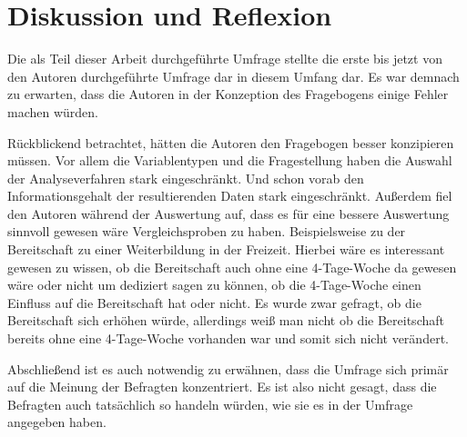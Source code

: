 \chapter{Diskussion und Reflexion}


Die als Teil dieser Arbeit durchgeführte Umfrage stellte die erste bis jetzt von den Autoren durchgeführte
Umfrage dar in diesem Umfang dar. Es war demnach zu erwarten, dass die Autoren in der Konzeption des Fragebogens
einige Fehler machen würden. 

Rückblickend betrachtet, hätten die Autoren den Fragebogen besser konzipieren müssen.
Vor allem die Variablentypen und die Fragestellung haben die Auswahl der Analyseverfahren stark eingeschränkt. Und schon
vorab den Informationsgehalt der resultierenden Daten stark eingeschränkt.
Außerdem fiel den Autoren während der Auswertung auf, dass es für eine bessere Auswertung sinnvoll gewesen wäre 
Vergleichsproben zu haben. Beispielsweise zu der Bereitschaft zu einer Weiterbildung in der Freizeit. 
Hierbei wäre es interessant gewesen zu wissen, ob die Bereitschaft auch ohne eine 4-Tage-Woche da gewesen 
wäre oder nicht um dediziert sagen zu können, ob die 4-Tage-Woche einen Einfluss auf die Bereitschaft hat oder nicht.
Es wurde zwar gefragt, ob die Bereitschaft sich erhöhen würde, allerdings weiß man nicht
ob die Bereitschaft bereits ohne eine 4-Tage-Woche vorhanden war und somit sich nicht verändert.

Abschließend ist es auch notwendig zu erwähnen, dass die Umfrage sich primär auf die Meinung der Befragten konzentriert.
Es ist also nicht gesagt, dass die Befragten auch tatsächlich so handeln würden, wie sie es in der Umfrage angegeben haben.